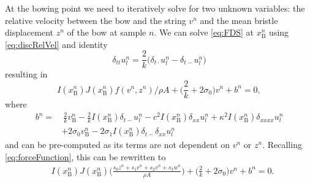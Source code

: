     At the bowing point we need to iteratively solve for two unknown variables: the relative velocity between the bow and the string $v^n$ and the mean bristle displacement $z^n$ of the bow at sample $n$.
    We can solve \eqref{eq:FDS} at $x_\text{B}^n$ using \eqref{eq:discRelVel} and identity \cite{Bilbao2009}
    \begin{equation}
        \delta_{tt}u_l^n = \frac{2}{k}\big(\delta_{t\cdot}u_l^n-\delta_{t-}u_l^n\big)
    \end{equation}
    resulting in 
    \begin{equation} \label{eq:incIdentity}
        I(x_\text{B}^n)J(x_\text{B}^n)f(v^n,z^n)/\rho A+\Big(\frac{2}{k}+2\sigma_{0}\Big) v^n+b^n = 0,
    \end{equation}
    where 
    \begin{equation}\label{eq:bn}
            \begin{aligned}b^n =& \: \frac{2}{k}v_\text{B}^n-\frac{2}{k}I(x_\text{B}^n)\delta_{t-}u_l^n - c^2 I(x_\text{B}^n)\delta_{xx} u_l^n +\kappa^2I(x_\text{B}^n)\delta_{xxxx} u_l^n \\
        &+ 2\sigma_0v_\text{B}^n -2\sigma_1I(x_\text{B}^n)\delta_{t-}\delta_{xx}u_l^n
    \end{aligned}
    \end{equation}
    and can be pre-computed as its terms are not dependent on $v^n$ or $z^n$. Recalling \eqref{eq:forceFunction}, this can be rewritten to
    \begin{equation}\label{eq:newtonFunction}
    \begin{aligned}
        &I(x_\text{B}^n)J(x_\text{B}^n)\Bigg(\frac{s_0z^n+s_1r^n+s_2v^n+s_3w^n}{\rho A}
        \Bigg)+\Big(\frac{2}{k} + 2\sigma_0 \Big)v^n+ b^n= 0.
        \end{aligned}
    \end{equation}
